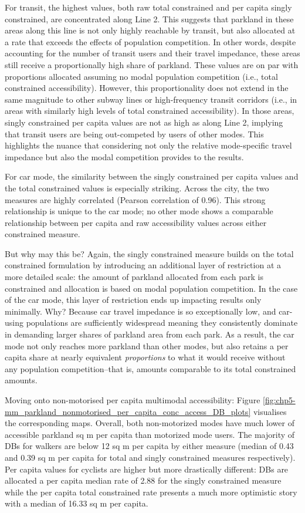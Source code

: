 \documentclass[
11pt, %
oneside, %
english, %
singlespacing, %
]{macthesis} %
\begin{document}
For transit, the highest values, both raw total constrained and per capita singly constrained, are concentrated along Line 2. This suggests that parkland in these areas along this line is not only highly reachable by transit, but also allocated at a rate that exceeds the effects of population competition. In other words, despite accounting for the number of transit users and their travel impedance, these areas still receive a proportionally high share of parkland. These values are on par with proportions allocated assuming no modal population competition (i.e., total constrained accessibility). However, this proportionality does not extend in the same magnitude to other subway lines or high-frequency transit corridors (i.e., in areas with similarly high levels of total constrained accessibility). In those areas, singly constrained per capita values are not as high as along Line 2, implying that transit users are being out-competed by users of other modes. This highlights the nuance that considering not only the relative mode-specific travel impedance but also the modal competition provides to the results.

For car mode, the similarity between the singly constrained per capita values and the total constrained values is especially striking. Across the city, the two measures are highly correlated (Pearson correlation of 0.96). This strong relationship is unique to the car mode; no other mode shows a comparable relationship between per capita and raw accessibility values across either constrained measure.

But why may this be? Again, the singly constrained measure builds on the total constrained formulation by introducing an additional layer of restriction at a more detailed scale: the amount of parkland allocated from each park is constrained and allocation is based on modal population competition. In the case of the car mode, this layer of restriction ends up impacting results only minimally. Why? Because car travel impedance is so exceptionally low, and car-using populations are sufficiently widespread meaning they consistently dominate in demanding larger shares of parkland area from each park. As a result, the car mode not only reaches more parkland than other modes, but also retains a per capita share at nearly equivalent \emph{proportions} to what it would receive without any population competition--that is, amounts comparable to its total constrained amounts.

Moving onto non-motorised per capita multimodal accessibility: Figure \ref{fig:chp5-mm_parkland_nonmotorised_per_capita_conc_access_DB_plots} visualises the corresponding maps. Overall, both non-motorized modes have much lower of accessible parkland sq m per capita than motorized mode users. The majority of DBs for walkers are below 12 sq m per capita by either measure (median of 0.43 and 0.39 sq m per capita for total and singly constrained measures respectively). Per capita values for cyclists are higher but more drastically different: DBs are allocated a per capita median rate of 2.88 for the singly constrained measure while the per capita total constrained rate presents a much more optimistic story with a median of 16.33 sq m per capita.
\end{document}
